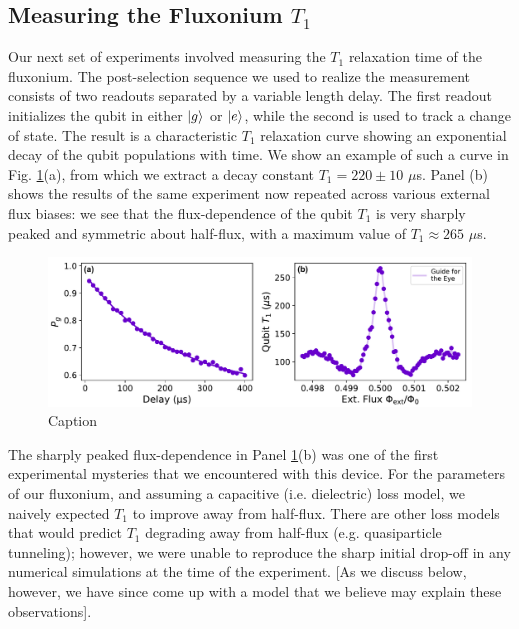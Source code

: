 \subsection{Measuring the Fluxonium \texorpdfstring{$T_1$}{T1}}

Our next set of experiments involved measuring the $T_1$ relaxation time of the fluxonium. The post-selection sequence we used to realize the measurement consists of two readouts separated by a variable length delay. The first readout initializes the qubit in either $\lvert g\rangle$ or $\lvert e\rangle$, while the second is used to track a change of state. The result is a characteristic $T_1$ relaxation curve showing an exponential decay of the qubit populations with time. We show an example of such a curve in Fig. \ref{fig:4_qubit_T1_vs_flux_single}(a), from which we extract a decay constant $T_1 = 220 \pm 10$ $\mu$s. Panel (b) shows the results of the same experiment now repeated across various external flux biases: we see that the flux-dependence of the qubit $T_1$ is very sharply peaked and symmetric about half-flux, with a maximum value of $T_1 \approx 265$ $\mu$s.

\begin{figure}[h]
    \centering
    \includegraphics[width=0.95\linewidth]{Figures/4/qubit_T1_vs_flux_single.pdf}
    \caption{Caption}
    \label{fig:4_qubit_T1_vs_flux_single}
\end{figure}

The sharply peaked flux-dependence in Panel \ref{fig:4_qubit_T1_vs_flux_single}(b) was one of the first experimental mysteries that we encountered with this device. For the parameters of our fluxonium, and assuming a capacitive (i.e. dielectric) loss model, we naively expected $T_1$ to improve away from half-flux. There are other loss models that would predict $T_1$ degrading away from half-flux (e.g. quasiparticle tunneling); however, we were unable to reproduce the sharp initial drop-off in any numerical simulations at the time of the experiment. [As we discuss below, however, we have since come up with a model that we believe may explain these observations]. 

